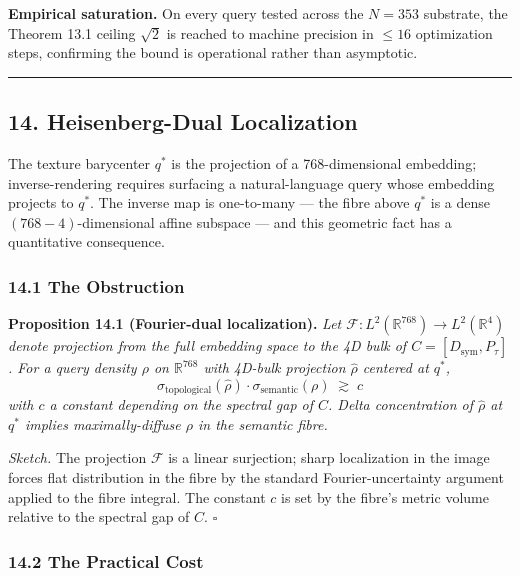 \documentclass[
  11pt,
]{article}
\begin{document}
\textbf{Empirical saturation.} On every query tested across the
\(N = 353\) substrate, the Theorem 13.1 ceiling \(\sqrt 2\) is reached
to machine precision in \(\leq 16\) optimization steps, confirming the
bound is operational rather than asymptotic.

\begin{center}\rule{0.5\linewidth}{0.5pt}\end{center}

\subsection{14. Heisenberg-Dual
Localization}\label{heisenberg-dual-localization}

The texture barycenter \(q^*\) is the projection of a 768-dimensional
embedding; inverse-rendering requires surfacing a natural-language query
whose embedding projects to \(q^*\). The inverse map is one-to-many ---
the fibre above \(q^*\) is a dense \((768 - 4)\)-dimensional affine
subspace --- and this geometric fact has a quantitative consequence.

\subsubsection{14.1 The Obstruction}\label{the-obstruction}

\textbf{Proposition 14.1 (Fourier-dual localization).} \emph{Let
\(\mathcal{F} : L^2(\mathbb{R}^{768}) \to L^2(\mathbb{R}^4)\) denote
projection from the full embedding space to the 4D bulk of
\(C = [D_\text{sym}, P_\tau]\). For a query density \(\rho\) on
\(\mathbb{R}^{768}\) with 4D-bulk projection \(\hat\rho\) centered at
\(q^*\),}
\[\sigma_\text{topological}(\hat\rho) \cdot \sigma_\text{semantic}(\rho) \;\gtrsim\; c \tag{14.1}\]
\emph{with \(c\) a constant depending on the spectral gap of \(C\).
Delta concentration of \(\hat\rho\) at \(q^*\) implies maximally-diffuse
\(\rho\) in the semantic fibre.}

\emph{Sketch.} The projection \(\mathcal{F}\) is a linear surjection;
sharp localization in the image forces flat distribution in the fibre by
the standard Fourier-uncertainty argument applied to the fibre integral.
The constant \(c\) is set by the fibre's metric volume relative to the
spectral gap of \(C\). \(\square\)

\subsubsection{14.2 The Practical Cost}\label{the-practical-cost}
\end{document}
